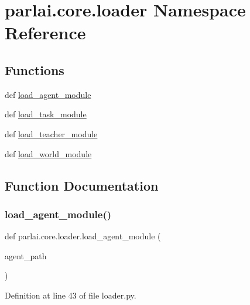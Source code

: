 \hypertarget{namespaceparlai_1_1core_1_1loader}{}\section{parlai.\+core.\+loader Namespace Reference}
\label{namespaceparlai_1_1core_1_1loader}
\subsection*{Functions}
\begin{DoxyCompactItemize}
\item 
def \hyperlink{namespaceparlai_1_1core_1_1loader_a8e6a8f524cba24b80e9bd157c2e0ab8b}{load\+\_\+agent\+\_\+module}
\item 
def \hyperlink{namespaceparlai_1_1core_1_1loader_a7ae3c6abd5c669634eb8940902735fc4}{load\+\_\+task\+\_\+module}
\item 
def \hyperlink{namespaceparlai_1_1core_1_1loader_a9eed9fa0f15170da9d4de24c2c3d4e2a}{load\+\_\+teacher\+\_\+module}
\item 
def \hyperlink{namespaceparlai_1_1core_1_1loader_adb9c272f49c31c45dcbc61d8e8c6316d}{load\+\_\+world\+\_\+module}
\end{DoxyCompactItemize}


\subsection{Function Documentation}
\mbox{\label{namespaceparlai_1_1core_1_1loader_a8e6a8f524cba24b80e9bd157c2e0ab8b}} 
\subsubsection{\texorpdfstring{load\+\_\+agent\+\_\+module()}{load\_agent\_module()}}
{\footnotesize\ttfamily def parlai.\+core.\+loader.\+load\+\_\+agent\+\_\+module (\begin{DoxyParamCaption}\item[{}]{agent\+\_\+path }\end{DoxyParamCaption})}



Definition at line 43 of file loader.\+py.


